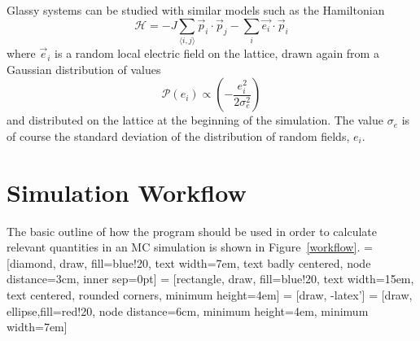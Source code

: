 \documentclass[aps,prb,twocolumn,showpacs,superscriptaddress,floatfix]{revtex4-1}
\begin{document}
Glassy systems can be studied with similar models such as the Hamiltonian
\begin{equation}
\mathcal{H} = -J\sum_{\langle i,j\rangle} \vec{p}_i \cdot \vec{p}_j - \sum_i\vec{e_i}\cdot\vec{p}_i
\end{equation}
where $\vec{e}_i$ is a random local electric field on the lattice, drawn again from a Gaussian distribution of values 
\begin{equation}
\mathcal{P}(e_i) \propto \left( -\frac{e_{i}^2}{2\sigma_{e}^2} \right)
\end{equation}
and distributed on the lattice at the beginning of the simulation. The value $\sigma_{e}$ is of course the standard deviation of the distribution of random fields, $e_i$. 
\section{Simulation Workflow}
The basic outline of how the program should be used in order to calculate relevant quantities in an MC simulation is shown in Figure~\ref{workflow}.
\clearpage
 = [diamond, draw, fill=blue!20, 
    text width=7em, text badly centered, node distance=3cm, inner sep=0pt]
 = [rectangle, draw, fill=blue!20, 
    text width=15em, text centered, rounded corners, minimum height=4em]
 = [draw, -latex']
 = [draw, ellipse,fill=red!20, node distance=6cm,
    minimum height=4em, minimum width=7em]
    
\end{document}
